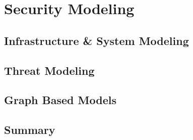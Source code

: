 

\section{Security Modeling}\label{sec:background:modeling}



\subsection{Infrastructure \& System Modeling}

\label{sec:background:modeling:infra_modeling}

\subsection{Threat Modeling}

\label{sec:background:modeling:attack_modeling}


\subsection{Graph Based Models}\label{sec:background:modeling:attack_graphs}



\subsection{Summary}\label{sec:background:modeling:summary}

